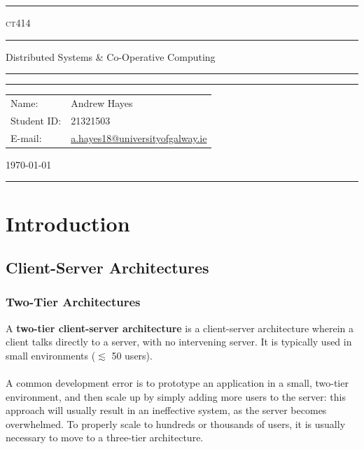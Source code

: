 \documentclass[a4paper,11pt]{article}
\author{Andrew Hayes}
\begin{document}
\begin{titlepage}
    \begin{center}
        \hrule
        \vspace*{0.6cm}
        \Huge \textsc{ct414}
        \vspace*{0.6cm}
        \hrule
        \LARGE
       \vspace{0.5cm}
       Distributed Systems \& Co-Operative Computing
       \vspace{0.5cm}
       \hrule

       \vfill

       \hrule
        \begin{minipage}{0.495\textwidth} 
            \vspace{0.4em}
            \raggedright
            \normalsize 
            \begin{tabular}{@{}l l}
                Name: & Andrew Hayes \\
                Student ID: & 21321503 \\
                E-mail: & \href{mailto://a.hayes18@universityofgalway.ie}{a.hayes18@universityofgalway.ie} \\
            \end{tabular}
        \end{minipage}
        \begin{minipage}{0.495\textwidth} 
            \raggedleft
            \vspace*{0.8cm}
            \Large
            \today
            \vspace*{0.6cm}
        \end{minipage}
        \medskip\hrule 
    \end{center}
\end{titlepage}

\newpage
\tableofcontents
\newpage
\setcounter{page}{1}

\section{Introduction}
\subsection{Client-Server Architectures}
\subsubsection{Two-Tier Architectures}
A \textbf{two-tier client-server architecture} is a client-server architecture wherein a client talks directly to a server, with no intervening server.
It is typically used in small environments ($\lesssim$ 50 users).
\\\\
A common development error is to prototype an application in a small, two-tier environment, and then scale up by simply adding more users to the server:
this approach will usually result in an ineffective system, as the server becomes overwhelmed.
To properly scale to hundreds or thousands of users, it is usually necessary to move to a three-tier architecture.
\end{document}
